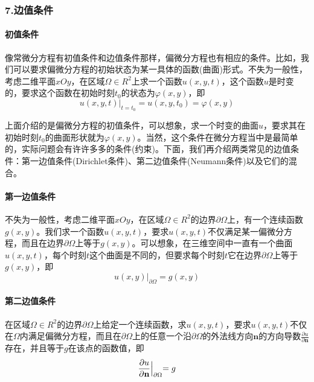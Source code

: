         \subsubsection{7.边值条件}
            \paragraph{初值条件}
            像常微分方程有初值条件和边值条件那样，偏微分方程也有相应的条件。比如，我们可以要求偏微分方程的初始状态为某一具体的函数(曲面)形式。不失为一般性，考虑二维平面$xOy$，在区域$\Omega \in R^2$上求一个函数$u(x,y,t)$，这个函数$u$是时变的，要求这个函数在初始时刻$t_0$的状态为$\varphi (x,y)$，即
            \[
                u(x,y,t) \bigl|_{t=t_0} = u(x,y,t_0) = \varphi (x,y)
            \]
            \par
            上面介绍的是偏微分方程的初值条件，可以想象，求一个时变的曲面$u$，要求其在初始时刻$t_0$的曲面形状就为$\varphi (x,y)$。当然，这个条件在微分方程当中是最简单的，实际问题会有许许多多的条件(约束)。下面，我们再介绍两类常见的边值条件：第一边值条件(Dirichlet条件)、第二边值条件(Neumann条件)以及它们的混合。
            \paragraph{第一边值条件}不失为一般性，考虑二维平面$xOy$，在区域$\Omega \in R^2$的边界$\partial \Omega$上，有一个连续函数$g(x,y)$。我们求一个函数$u(x,y,t)$，要求$u(x,y,t)$不仅满足某一偏微分方程，而且在边界$ \partial \Omega$上等于$g(x,y)$。可以想象，在三维空间中一直有一个曲面$u(x,y,t)$，每个时刻$t$这个曲面是不同的，但要求每个时刻$t$它在边界$\partial \Omega$上等于$g(x,y)$，即
            \[
                u(x,y)\bigl|_{\partial \Omega} = g(x,y)
            \]
            \paragraph{第二边值条件}在区域$\Omega \in R^2$的边界$\partial \Omega$上给定一个连续函数，求$u(x,y,t)$，要求$u(x,y,t)$不仅在$\Omega$内满足偏微分方程，而且在$\partial \Omega$上的任意一个沿$\partial \Omega$的外法线方向$\mathbf{n}$的方向导数$\frac{\partial u}{\partial \mathbf{n}}$存在，并且等于$g$在该点的函数值，即
            \[
                \frac{\partial u}{\partial \mathbf{n}} \Bigl|_{\partial \Omega} = g
            \]
